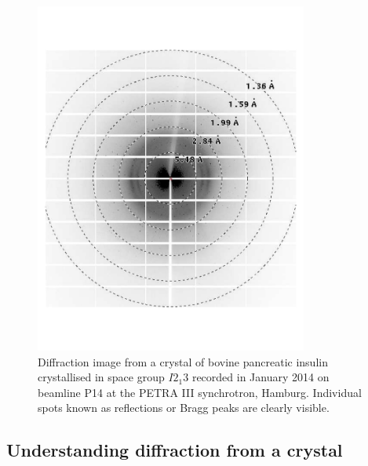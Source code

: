         \begin{figure}
            \centering
            \includegraphics[width=0.8\textwidth]{figures/introduction/InsulinDiffractionImage.pdf}
            \caption{Diffraction image from a crystal of bovine pancreatic insulin crystallised in space group $I2_1 3$ recorded in January 2014 on beamline P14 at the PETRA III synchrotron, Hamburg. Individual spots known as reflections or Bragg peaks are clearly visible.}
            \label{fig:Insulin diffraction image}
        \end{figure}
    \subsection{Understanding diffraction from a crystal}
    \label{sub:Understanding diffraction from a crystal}

